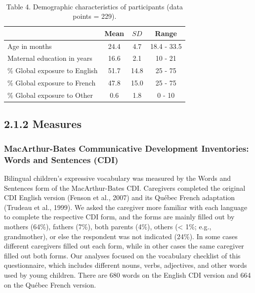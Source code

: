 \documentclass[
  english,
  ,man,floatsintext]{apa6}
\begin{document}
~

\begin{table}[h]

\begin{center}
\begin{threeparttable}

\caption{\label{tab:table4}Table 4. Demographic characteristics of participants (data points = 229).}

\begin{tabular}{lccc}
\toprule
 & Mean & $SD$ & Range\\
\midrule
Age in months & 24.4 & 4.7 & 18.4 - 33.5\\
Maternal education in years & 16.6 & 2.1 & 10 - 21\\
\% Global exposure to English & 51.7 & 14.8 & 25 - 75\\
\% Global exposure to French & 47.8 & 15.0 & 25 - 75\\
\% Global exposure to Other & 0.6 & 1.8 & 0 - 10\\
\bottomrule
\end{tabular}

\end{threeparttable}
\end{center}

\end{table}

\hypertarget{measures}{%
\subsection{2.1.2 Measures}\label{measures}}

\hypertarget{macarthur-bates-communicative-development-inventories-words-and-sentences-cdi}{%
\subsubsection{MacArthur-Bates Communicative Development Inventories: Words and Sentences (CDI)}\label{macarthur-bates-communicative-development-inventories-words-and-sentences-cdi}}

Bilingual children's expressive vocabulary was measured by the Words and Sentences form of the MacArthur-Bates CDI. Caregivers completed the original CDI English version (Fenson et al., 2007) and its Québec French adaptation (Trudeau et al., 1999). We asked the caregiver more familiar with each language to complete the respective CDI form, and the forms are mainly filled out by mothers (64\%), fathers (7\%), both parents (4\%), others (\textless{} 1\%; e.g., grandmother), or else the respondent was not indicated (24\%). In some cases different caregivers filled out each form, while in other cases the same caregiver filled out both forms. Our analyses focused on the vocabulary checklist of this questionnaire, which includes different nouns, verbs, adjectives, and other words used by young children. There are 680 words on the English CDI version and 664 on the Québec French version.
\end{document}
